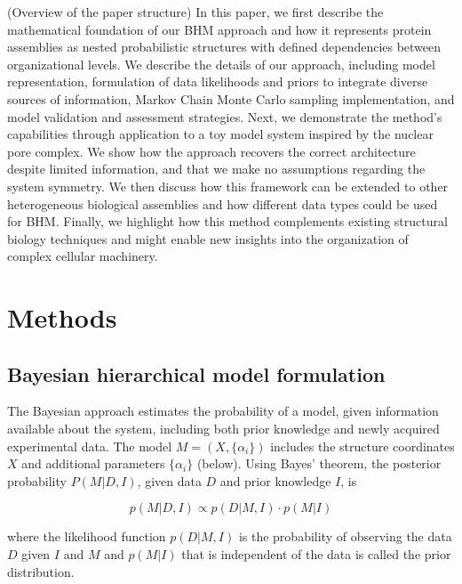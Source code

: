 \documentclass[journal=jcim,manuscript=article]{achemso}
\begin{document}
(Overview of the paper structure) In this paper, we first describe the mathematical foundation of our BHM approach and how it represents protein assemblies as nested probabilistic structures with defined dependencies between organizational levels. We describe the details of our approach, including model representation, formulation of data likelihoods and priors to integrate diverse sources of information, Markov Chain Monte Carlo sampling implementation, and model validation and assessment strategies. Next, we demonstrate the method's capabilities through application to a toy model system inspired by the nuclear pore complex. We show how the approach recovers the correct architecture despite limited information, and that we make no assumptions regarding the system symmetry. We then discuss how this framework can be extended to other heterogeneous biological assemblies and how different data types could be used for BHM. Finally, we highlight how this method complements existing structural biology techniques and might enable new insights into the organization of complex cellular machinery.

\section{Methods}\label{sec2}
\subsection{Bayesian hierarchical model formulation}
The Bayesian approach \cite{Rieping05Science309p303} estimates the probability of a model, given information available about the system, including both prior knowledge and newly acquired experimental data. The model $M=(X,\{\alpha_i\})$ includes the structure coordinates $X$ and additional parameters $\{\alpha_i\}$ (below). Using Bayes’ theorem, the posterior probability $P(M|D,I)$, given data $D$ and prior knowledge $I$, is
 
\begin{equation}
    p(M|D,I) \propto p(D|M,I) \cdot p(M|I)
\end{equation}

where the likelihood function $p(D|M,I)$ is the probability
of observing the data $D$ given $I$ and $M$ and $p(M|I)$ that is independent of the data is called the prior distribution. 
\end{document}
